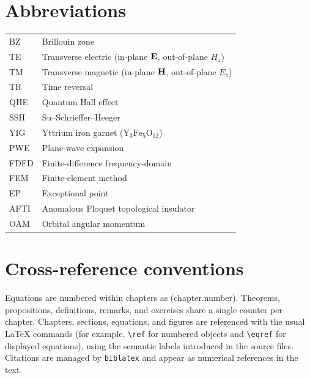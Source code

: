 \section*{Abbreviations}

\begin{center}
\begin{tabular}{ll}
  \toprule
  BZ & Brillouin zone \\
  TE & Transverse electric (in-plane $\mathbf{E}$, out-of-plane $H_z$) \\
  TM & Transverse magnetic (in-plane $\mathbf{H}$, out-of-plane $E_z$) \\
  TR & Time reversal \\
  QHE & Quantum Hall effect \\
  SSH & Su--Schrieffer--Heeger \\
  YIG & Yttrium iron garnet ($\mathrm{Y_3Fe_5O_{12}}$) \\
  PWE & Plane-wave expansion \\
  FDFD & Finite-difference frequency-domain \\
  FEM & Finite-element method \\
  EP & Exceptional point \\
  AFTI & Anomalous Floquet topological insulator \\
  OAM & Orbital angular momentum \\
  \bottomrule
\end{tabular}
\end{center}

\section*{Cross-reference conventions}

Equations are numbered within chapters as (chapter.number).
Theorems, propositions, definitions, remarks, and exercises share a
single counter per chapter.  Chapters, sections, equations, and figures
are referenced with the usual LaTeX commands (for example,
\verb|\ref| for numbered objects and \verb|\eqref| for displayed
equations), using the semantic labels introduced in the source files.
Citations are managed by \texttt{biblatex} and appear as numerical
references in the text.
